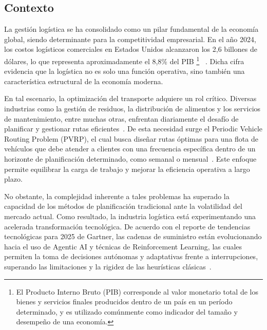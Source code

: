 \label{sec:def}

\subsection{Contexto} \label{sec:Contexto}
La gestión logística se ha consolidado como un pilar fundamental de la economía global, siendo determinante para la competitividad empresarial. En el año 2024, los costos logísticos comerciales en Estados Unidos alcanzaron los 2,6 billones de dólares, lo que representa aproximadamente el 8,8\% del PIB \footnote{El Producto Interno Bruto (PIB) corresponde al valor monetario total de los bienes y servicios finales producidos dentro de un país en un período determinado, y es utilizado comúnmente como indicador del tamaño y desempeño de una economía.} ~\cite{CSCMP2024}. Dicha cifra evidencia que la logística no es solo una función operativa, sino también una característica estructural de la economía moderna.

En tal escenario, la optimización del transporte adquiere un rol crítico. Diversas industrias como la gestión de residuos, la distribución de alimentos y los servicios de mantenimiento, entre muchas otras, enfrentan diariamente el desafío de planificar y gestionar rutas eficientes~\cite{UpperVRP}. De esta necesidad surge el Periodic Vehicle Routing Problem (PVRP), el cual busca diseñar rutas óptimas para una flota de vehículos que debe atender a clientes con una frecuencia específica dentro de un horizonte de planificación determinado, como semanal o mensual~\cite{EKSIOGLU20091472}. Este enfoque permite equilibrar la carga de trabajo y mejorar la eficiencia operativa a largo plazo.

No obstante, la complejidad inherente a tales problemas ha superado la capacidad de los métodos de planificación tradicional ante la volatilidad del mercado actual. Como resultado, la industria logística está experimentando una acelerada transformación tecnológica. De acuerdo con el reporte de tendencias tecnológicas para 2025 de Gartner, las cadenas de suministro están evolucionando hacia el uso de Agentic AI y técnicas de Reinforcement Learning, las cuales permiten la toma de decisiones autónomas y adaptativas frente a interrupciones, superando las limitaciones y la rigidez de las heurísticas clásicas~\cite{Gartner2025}.

